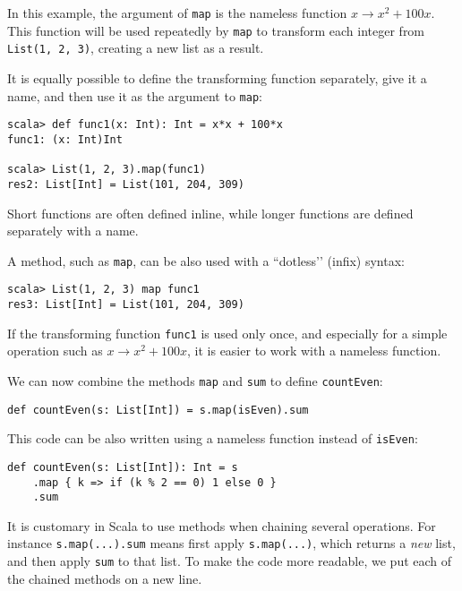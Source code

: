 In this example, the argument of \lstinline!map! is the nameless
function $x\rightarrow x^{2}+100x$. This function will be used repeatedly
by \texttt{}\lstinline!map! to transform each integer from \lstinline!List(1, 2, 3)!,
creating a new list as a result.

It is equally possible to define the transforming function separately,
give it a name, and then use it as the argument to \lstinline!map!:
\begin{lstlisting}
scala> def func1(x: Int): Int = x*x + 100*x
func1: (x: Int)Int 

scala> List(1, 2, 3).map(func1)
res2: List[Int] = List(101, 204, 309)
\end{lstlisting}
Short functions are often defined inline, while longer functions are
defined separately with a name.

A method, such as \lstinline!map!, can be also used with a \textsf{``}dotless\textsf{'}'
(infix) syntax:
\begin{lstlisting}
scala> List(1, 2, 3) map func1
res3: List[Int] = List(101, 204, 309)
\end{lstlisting}

If the transforming function \lstinline!func1! is used only once,
and especially for a simple operation such as $x\rightarrow x^{2}+100x$,
it is easier to work with a nameless function.

We can now combine the methods \texttt{}\lstinline!map! and \texttt{}\lstinline!sum!
to define \lstinline!countEven!:

\begin{lstlisting}
def countEven(s: List[Int]) = s.map(isEven).sum
\end{lstlisting}

This code can be also written using a nameless function instead of
\lstinline!isEven!:

\begin{lstlisting}
def countEven(s: List[Int]): Int = s
    .map { k => if (k % 2 == 0) 1 else 0 }
    .sum
\end{lstlisting}

It is customary in Scala to use methods when chaining several operations.
For instance \lstinline!s.map(...).sum! means first apply \lstinline!s.map(...)!,
which returns a \emph{new} list, and then apply \texttt{}\lstinline!sum!
to that list. To make the code more readable, we put each of the chained
methods on a new line. 

